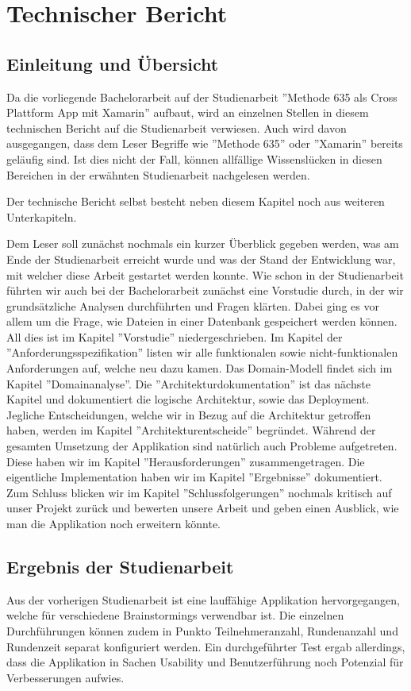 \section{Technischer Bericht}

\subsection{Einleitung und Übersicht}
Da die vorliegende Bachelorarbeit auf der Studienarbeit ''Methode 635 als Cross Plattform App mit Xamarin'' \cite{methode635-sa} aufbaut, wird an einzelnen Stellen in diesem technischen Bericht auf die Studienarbeit verwiesen. Auch wird davon ausgegangen, dass dem Leser Begriffe wie ''Methode 635'' oder ''Xamarin'' bereits geläufig sind. Ist dies nicht der Fall, können allfällige Wissenslücken in diesen Bereichen in der erwähnten Studienarbeit nachgelesen werden.

Der technische Bericht selbst besteht neben diesem Kapitel noch aus weiteren Unterkapiteln. 

Dem Leser soll zunächst nochmals ein kurzer Überblick gegeben werden, was am Ende der Studienarbeit erreicht wurde und was der Stand der Entwicklung war, mit welcher diese Arbeit gestartet werden konnte. Wie schon in der Studienarbeit führten wir auch bei der Bachelorarbeit zunächst eine Vorstudie durch, in der wir grundsätzliche Analysen durchführten und Fragen klärten. Dabei ging es vor allem um die Frage, wie Dateien in einer Datenbank gespeichert werden können. All dies ist im Kapitel ''Vorstudie'' niedergeschrieben. Im Kapitel der ''Anforderungsspezifikation'' listen wir alle funktionalen sowie nicht-funktionalen Anforderungen auf, welche neu dazu kamen. Das Domain-Modell findet sich im Kapitel ''Domainanalyse''. Die ''Architektur\-dokumentation'' ist das nächste Kapitel und dokumentiert die logische Architektur, sowie das Deployment. Jegliche Entscheidungen, welche wir in Bezug auf die Architektur getroffen haben, werden im Kapitel ''Architekturentscheide'' begründet. Während der gesamten Umsetzung der Applikation sind natürlich auch Probleme aufgetreten. Diese haben wir im Kapitel ''Herausforderungen'' zusammengetragen. Die eigentliche Implementation haben wir im Kapitel ''Ergebnisse'' dokumentiert. Zum Schluss blicken wir im Kapitel ''Schlussfolgerungen'' nochmals kritisch auf unser Projekt zurück und bewerten unsere Arbeit und geben einen Ausblick, wie man die Applikation noch erweitern könnte.

\subsection{Ergebnis der Studienarbeit}
Aus der vorherigen Studienarbeit ist eine lauffähige Applikation hervorgegangen, welche für verschiedene Brainstormings verwendbar ist. Die einzelnen Durchführungen können zudem in Punkto Teilnehmeranzahl, Rundenanzahl und Rundenzeit separat konfiguriert werden. Ein durchgeführter Test ergab allerdings, dass die Applikation in Sachen Usability und Benutzerführung noch Potenzial für Verbesserungen aufwies.


